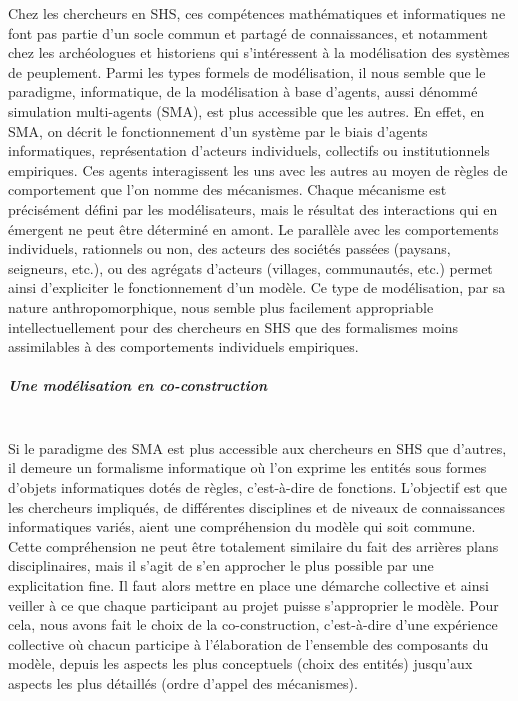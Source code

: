 Chez les chercheurs en SHS, ces compétences mathématiques et informatiques ne font pas partie d'un socle commun et partagé de connaissances, et notamment chez les archéologues et historiens qui s'intéressent à la modélisation des systèmes de peuplement.
Parmi les types formels de modélisation, il nous semble que le paradigme, informatique, de la modélisation à base d'agents, aussi dénommé \og simulation multi-agents\fg{} (SMA), est plus accessible que les autres.
En effet, en SMA, on décrit le fonctionnement d'un système par le biais d'agents informatiques, représentation d'acteurs individuels, collectifs ou institutionnels empiriques.
Ces agents interagissent les uns avec les autres au moyen de \og règles de comportement\fg{} que l'on nomme des mécanismes.
Chaque mécanisme est précisément défini par les modélisateurs, mais le résultat des interactions qui en émergent ne peut être déterminé en amont.
Le parallèle avec les comportements individuels, rationnels ou non, des acteurs des sociétés passées (paysans, seigneurs, etc.), ou des agrégats d'acteurs (villages, communautés, etc.) permet ainsi d'expliciter le fonctionnement d'un modèle.
Ce type de modélisation, par sa nature anthropomorphique, nous semble plus facilement appropriable intellectuellement pour des chercheurs en SHS que des formalismes moins assimilables à des comportements individuels empiriques.

\subparagraph{Une modélisation en co-construction}\mbox{}\\
Si le paradigme des SMA est plus accessible aux chercheurs en SHS que d'autres, il demeure un formalisme informatique où l'on exprime les entités sous formes d'objets informatiques dotés de règles, c'est-à-dire de fonctions.
L'objectif est que les chercheurs impliqués, de différentes disciplines et de niveaux de connaissances informatiques variés, aient une compréhension du modèle qui soit commune.
Cette compréhension ne peut être totalement similaire du fait des arrières plans disciplinaires, mais il s'agit de s'en approcher le plus possible par une explicitation fine.
Il faut alors mettre en place une démarche collective et ainsi veiller à ce que chaque participant au projet puisse s'approprier le modèle.
Pour cela, nous avons fait le choix de la \og co-construction\fg{}, c'est-à-dire d'une expérience collective où chacun participe à l'élaboration de l'ensemble des composants du modèle, depuis les aspects les plus conceptuels (choix des entités) jusqu'aux aspects les plus détaillés (ordre d'appel des mécanismes).

